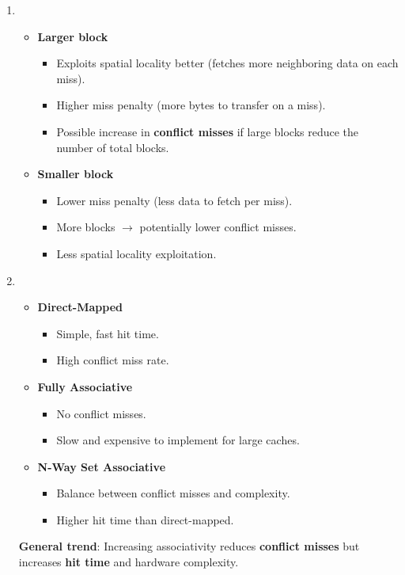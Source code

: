 \begin{enumerate}
    \item {}
    \begin{itemize}
        \item \textbf{Larger block}
        \begin{itemize}
            \item[\textcolor{Green3}{\faIcon{check}}] Exploits spatial locality better (fetches more neighboring data on each miss).
            \item[\textcolor{Red2}{\faIcon{times}}] Higher miss penalty (more bytes to transfer on a miss).
            \item[\textcolor{Red2}{\faIcon{times}}] Possible increase in \textbf{conflict misses} if large blocks reduce the number of total blocks.
        \end{itemize}
        \item \textbf{Smaller block}
        \begin{itemize}
            \item[\textcolor{Green3}{\faIcon{check}}] Lower miss penalty (less data to fetch per miss).
            \item[\textcolor{Green3}{\faIcon{check}}] More blocks $\rightarrow$ potentially lower conflict misses.
            \item[\textcolor{Red2}{\faIcon{times}}] Less spatial locality exploitation.
        \end{itemize}
    \end{itemize}
    \item {}
    \begin{itemize}
        \item \textbf{Direct-Mapped}
        \begin{itemize}
            \item[\textcolor{Green3}{\faIcon{check}}] Simple, fast hit time.
            \item[\textcolor{Red2}{\faIcon{times}}] High conflict miss rate.
        \end{itemize}
        \item \textbf{Fully Associative}
        \begin{itemize}
            \item[\textcolor{Green3}{\faIcon{check}}] No conflict misses.
            \item[\textcolor{Red2}{\faIcon{times}}] Slow and expensive to implement for large caches.
        \end{itemize}
        \item \textbf{N-Way Set Associative}
        \begin{itemize}
            \item[\textcolor{Green3}{\faIcon{check}}] Balance between conflict misses and complexity.
            \item[\textcolor{Red2}{\faIcon{times}}] Higher hit time than direct-mapped.
        \end{itemize}
    \end{itemize}
    \textbf{General trend}: Increasing associativity reduces \textbf{conflict misses} but increases \textbf{hit time} and hardware complexity.
    

\end{enumerate}
